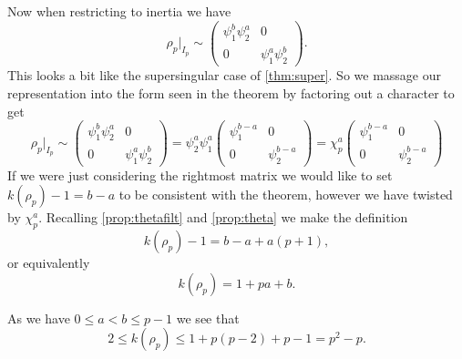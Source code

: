 \documentclass[a4paper,12pt]{article}
\begin{document}
Now when restricting to inertia we have
\[
\rho_p|_{I_{p}} \sim
\begin{pmatrix}
\psi_1^b\psi_2^a & 0 \\
0                & \psi_1^a\psi_2^b
\end{pmatrix}.
\]
This looks a bit like the supersingular case of \cref{thm:super}.
So we massage our representation into the form seen in the theorem by factoring out a character to get
\[
\rho_p|_{I_{p}} \sim
\begin{pmatrix}
\psi_1^b\psi_2^a & 0 \\
0                & \psi_1^a\psi_2^b
\end{pmatrix} =
\psi_2^a\psi_1^a\begin{pmatrix}
\psi_1^{b-a} & 0 \\
0            & \psi_2^{b-a}
\end{pmatrix} =
\chi_p^a\begin{pmatrix}
\psi_1^{b-a} & 0 \\
0            & \psi_2^{b-a}
\end{pmatrix}
\]
If we were just considering the rightmost matrix we would like to set $k(\rho_p) - 1 = b - a$ to be consistent with the theorem, however we have twisted by $\chi_p^a$.
Recalling \cref{prop:thetafilt} and \cref{prop:theta} we make the definition
\[
k(\rho_p) - 1 = b - a + a(p+1),
\]
or equivalently
\begin{equation}\label{eq:l2}
k(\rho_p) = 1 + pa + b.
\end{equation}

As we have $0 \le a< b \le p-1$ we see that
\[
2\le k(\rho_p) \le 1 + p(p-2) + p-1 = p^2-p.
\]
\end{document}
